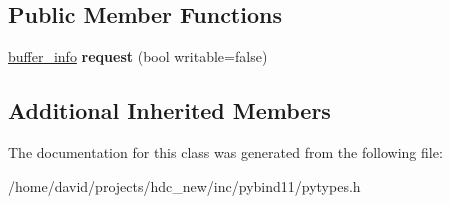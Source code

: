 \subsection*{Public Member Functions}
\begin{DoxyCompactItemize}
\item 
\hyperlink{structbuffer__info}{buffer\+\_\+info} {\bfseries request} (bool writable=false)\hypertarget{classbuffer_ae230c88bb40d2ea306a63830d1126975}{}\label{classbuffer_ae230c88bb40d2ea306a63830d1126975}

\end{DoxyCompactItemize}
\subsection*{Additional Inherited Members}


The documentation for this class was generated from the following file\+:\begin{DoxyCompactItemize}
\item 
/home/david/projects/hdc\+\_\+new/inc/pybind11/pytypes.\+h\end{DoxyCompactItemize}
